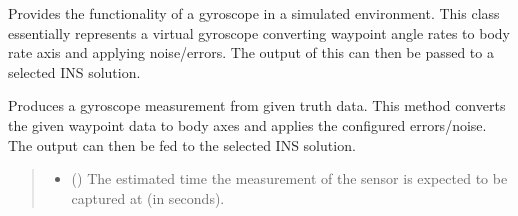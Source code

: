 \documentclass[letterpaper,10pt,english]{sphinxmanual}
\begin{document}
\begin{fulllineitems}
\label{\detokenize{modules/measurement/gyroscope:qnav.measurement.gyroscope.Gyroscope}}
\pysigstartsignatures
{}
\pysigstopsignatures
\sphinxAtStartPar
Provides the functionality of a gyroscope in a simulated environment.
This class essentially represents a virtual gyroscope converting
waypoint angle rates to body rate axis and applying noise/errors.
The output of this can then be passed to a selected INS solution.

\begin{fulllineitems}
\label{\detokenize{modules/measurement/gyroscope:qnav.measurement.gyroscope.Gyroscope.take_measurement}}
\pysigstartsignatures
{}
\pysigstopsignatures
\sphinxAtStartPar
Produces a gyroscope measurement from given truth data.
This method converts the given waypoint data to body axes and
applies the configured errors/noise. The output can then be
fed to the selected INS solution.
\begin{quote}\begin{description}
\begin{itemize}
\item {} 
\sphinxAtStartPar
{} () \textendash{} The estimated time the measurement of the sensor
is expected to be captured at (in seconds).


\end{itemize}
\end{description}
\end{quote}
\end{fulllineitems}
\end{fulllineitems}
\end{document}
